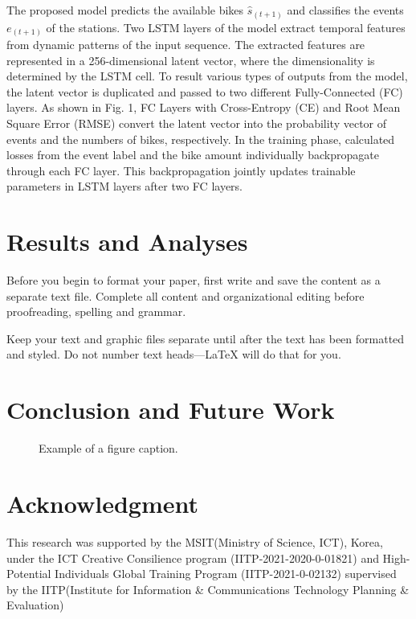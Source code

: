 \documentclass[conference]{IEEEtran}
\begin{document}
 The proposed model predicts the available bikes $\hat{s}_(t+1)$ and classifies the events $e_(t+1)$ of the stations. Two LSTM layers of the model extract temporal features from dynamic patterns of the input sequence. The extracted features are represented in a 256-dimensional latent vector, where the dimensionality is determined by the LSTM cell. To result various types of outputs from the model, the latent vector is duplicated and passed to two different Fully-Connected (FC) layers. As shown in Fig. 1, FC Layers with Cross-Entropy (CE) and Root Mean Square Error (RMSE) convert the latent vector into the probability vector of events and the numbers of bikes, respectively. In the training phase, calculated losses from the event label and the bike amount individually backpropagate through each FC layer. This backpropagation jointly updates trainable parameters in LSTM layers after two FC layers.


\section{Results and Analyses}
Before you begin to format your paper, first write and save the content as a 
separate text file. Complete all content and organizational editing before 
proofreading, spelling and grammar.

Keep your text and graphic files separate until after the text has been 
formatted and styled. Do not number text heads---{\LaTeX} will do that 
for you.

\section{Conclusion and Future Work}

\begin{figure}[htbp]
\caption{Example of a figure caption.}
\label{fig}
\end{figure}

\section*{Acknowledgment}
This research was supported by the MSIT(Ministry of Science, ICT), Korea, under the ICT Creative Consilience program (IITP-2021-2020-0-01821) and High-Potential Individuals Global Training Program (IITP-2021-0-02132) supervised by the IITP(Institute for Information \& Communications Technology Planning \& Evaluation)
\end{document}
